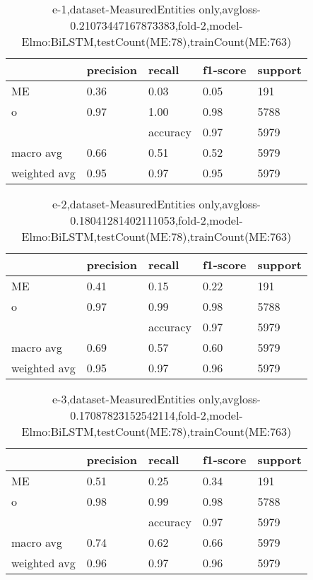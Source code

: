 \begin{table}[!ht] 
\centering
\caption{e-1,dataset-MeasuredEntities only,avgloss-0.21073447167873383,fold-2,model-Elmo:BiLSTM,testCount(ME:78),trainCount(ME:763)}\label{e-1data-meS.tsv}
\begin{tabularx}{300pt}{|X|X|X|X|X|}
\hline
&precision&recall&f1-score&support\\
\hline
ME&0.36&0.03&0.05&191\\
\hline
o&0.97&1.00&0.98&5788\\
\hline
&&accuracy&0.97&5979\\
\hline
macro avg&0.66&0.51&0.52&5979\\
\hline
weighted avg&0.95&0.97&0.95&5979\\
\hline
\end{tabularx}
\end{table}
\begin{table}[!ht] 
\centering
\caption{e-2,dataset-MeasuredEntities only,avgloss-0.18041281402111053,fold-2,model-Elmo:BiLSTM,testCount(ME:78),trainCount(ME:763)}\label{e-2data-meS.tsv}
\begin{tabularx}{300pt}{|X|X|X|X|X|}
\hline
&precision&recall&f1-score&support\\
\hline
ME&0.41&0.15&0.22&191\\
\hline
o&0.97&0.99&0.98&5788\\
\hline
&&accuracy&0.97&5979\\
\hline
macro avg&0.69&0.57&0.60&5979\\
\hline
weighted avg&0.95&0.97&0.96&5979\\
\hline
\end{tabularx}
\end{table}
\begin{table}[!ht] 
\centering
\caption{e-3,dataset-MeasuredEntities only,avgloss-0.17087823152542114,fold-2,model-Elmo:BiLSTM,testCount(ME:78),trainCount(ME:763)}\label{e-3data-meS.tsv}
\begin{tabularx}{300pt}{|X|X|X|X|X|}
\hline
&precision&recall&f1-score&support\\
\hline
ME&0.51&0.25&0.34&191\\
\hline
o&0.98&0.99&0.98&5788\\
\hline
&&accuracy&0.97&5979\\
\hline
macro avg&0.74&0.62&0.66&5979\\
\hline
weighted avg&0.96&0.97&0.96&5979\\
\hline
\end{tabularx}
\end{table}

